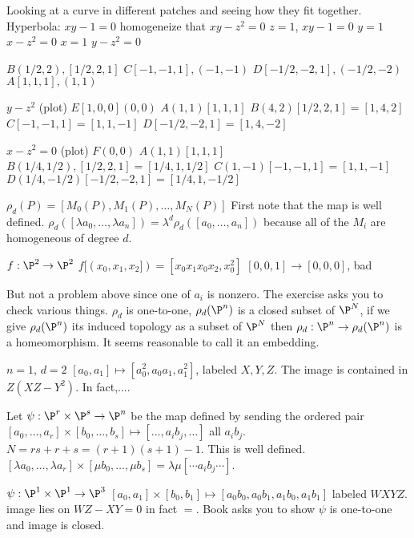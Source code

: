 
Looking at a curve in different patches and seeing how they fit together. 
Hyperbola: $xy-1=0$
homogeneize that $xy-z^2=0$
$z=1$, $xy-1=0$
$y=1$ $x-z^2=0$
$x=1$ $y-z^2=0$


$B(1/2,2), [1/2,2,1] $
$C[-1,-1,1], (-1,-1)$
$D[-1/2,-2,1], (-1/2,-2)$
$A[1,1,1],(1,1)$

$y- z^2$ (plot)
$E[1,0,0] (0,0)$
$A(1,1)[1,1,1]$
$B(4,2)[1/2,2,1]=[1,4,2]$
$C[-1,-1,1]=[1,1,-1]$
$D[-1/2,-2,1]=[1,4,-2]$

$x-z^2=0$ (plot)
$F(0,0)$
$A(1,1)[1,1,1]$
$B(1/4,1/2), [1/2,2,1]=[1/4,1,1/2]$
$C(1,-1)[-1,-1,1]= [1,1,-1]$
$D(1/4,-1/2)[-1/2,-2,1]=[1/4,1,-1/2]$



$\rho_d(P)= [M_0(P), M_1(P), \ldots, M_N(P)]$
First note that the map is well defined.
$\rho_d([\lambda a_0,\ldots, \lambda a_n])= \lambda^d \rho_d([a_0,\ldots,a_n])$ because all of the $M_i$ are homogeneous of degree $d$. 

$f: \P^2 \to \P^2$
$f[(x_0,x_1,x_2])= [x_0x_1x_0x_2,x_0^2]$
$[0,0,1] \to [0,0,0]$, bad 

But not a problem above since one of $a_i$ is nonzero. The exercise asks you to check various things. $\rho_d$ is one-to-one, $\rho_d(\P^n)$ is a closed subset of $\P^N$, if we give $\rho_d(\P^n)$ its induced topology as a subset of $\P^N$ then $\rho_d: \P^n \to \rho_d(\P^n)$ is a homeomorphism. It seems reasonable to call it an embedding.

\begin{ex}
$n=1$, $d=2$
$[a_0,a_1] \mapsto [a_0^2,a_0a_1,a_1^2]$, labeled $X,Y,Z$. The image is contained in $Z(XZ-Y^2)$. In fact,.... \xqed
\end{ex}

\begin{ex}
Let $\psi: \P^r \times \P^s \to \P^n$ be the map defined by sending the ordered pair $[a_0,\ldots,a_r] \times [b_0,\ldots,b_s] \mapsto [\ldots,a_ib_j,\ldots]$ all $a_ib_j$. $N= rs+r+s= (r+1)(s+1)-1$. This is well defined. $[\lambda a_0,\ldots,\lambda a_r] \times [\mu b_0,\ldots,\mu b_s]= \lambda \mu [\cdots a_ib_j \cdots]$. \xqed
\end{ex}


\begin{ex}
$\psi: \P^1 \times \P^1 \to \P^3$
$[a_0,a_1] \times [b_0,b_1] \mapsto [a_0b_0,a_0b_1,a_1b_0,a_1b_1]$ labeled $WXYZ$.
image lies on $WZ-XY=0$ in fact $=$. Book asks you to show $\psi$ is one-to-one and image is closed.  \xqed
\end{ex}


